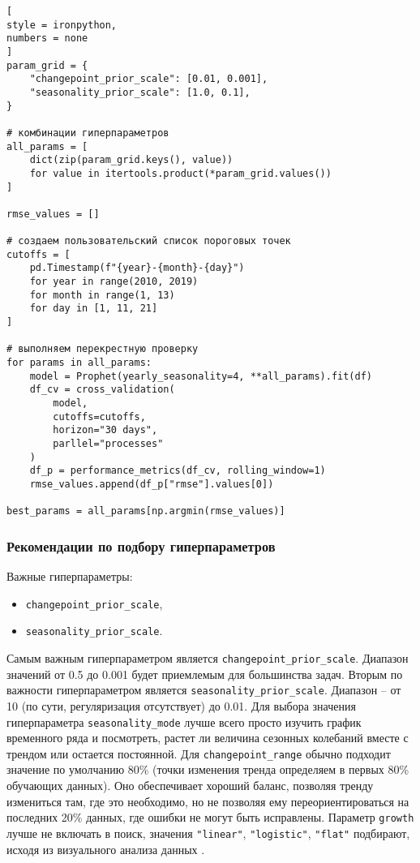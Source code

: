 \documentclass[%
	11pt,
	a4paper,
	utf8,
		]{article}
\begin{document}
\begin{lstlisting}[
style = ironpython,
numbers = none
]
param_grid = {
    "changepoint_prior_scale": [0.01, 0.001],
    "seasonality_prior_scale": [1.0, 0.1],
}

# комбинации гиперпараметров
all_params = [
    dict(zip(param_grid.keys(), value))
    for value in itertools.product(*param_grid.values())
]

rmse_values = []

# создаем пользовательский список пороговых точек
cutoffs = [
    pd.Timestamp(f"{year}-{month}-{day}")
    for year in range(2010, 2019)
    for month in range(1, 13)
    for day in [1, 11, 21]
]

# выполняем перекрестную проверку
for params in all_params:
    model = Prophet(yearly_seasonality=4, **all_params).fit(df)
    df_cv = cross_validation(
        model,
        cutoffs=cutoffs,
        horizon="30 days",
        parllel="processes"
    )
    df_p = performance_metrics(df_cv, rolling_window=1)
    rmse_values.append(df_p["rmse"].values[0])
    
best_params = all_params[np.argmin(rmse_values)]
\end{lstlisting}

\subsubsection{Рекомендации по подбору гиперпараметров}

Важные гиперпараметры:
\begin{itemize}
	\item \verb|changepoint_prior_scale|,
	
	\item \verb|seasonality_prior_scale|.
\end{itemize}

Самым важным гиперпараметром является \verb|changepoint_prior_scale|. Диапазон значений от 0.5 до 0.001 будет приемлемым для большинства задач. Вторым по важности гиперпараметром является \verb|seasonality_prior_scale|. Диапазон -- от 10 (по сути, регуляризация отсутствует) до 0.01. Для выбора значения гиперпараметра \verb|seasonality_mode| лучше всего просто изучить график временного ряда и посмотреть, растет ли величина сезонных колебаний вместе с трендом или остается постоянной.  Для \verb|changepoint_range| обычно подходит значение по умолчанию 80\% (точки изменения тренда определяем в первых 80\% обучающих данных). Оно обеспечивает хороший баланс, позволяя тренду измениться там, где это необходимо, но не позволяя ему переориентироваться на последних 20\% данных, где ошибки не могут быть исправлены. Параметр \verb|growth| лучше не включать в поиск, значения \verb|"linear"|, \verb|"logistic"|, \verb|"flat"| подбирают, исходя из визуального анализа данных \cite[]{gruzdev:time-series-2022}.
\end{document}
